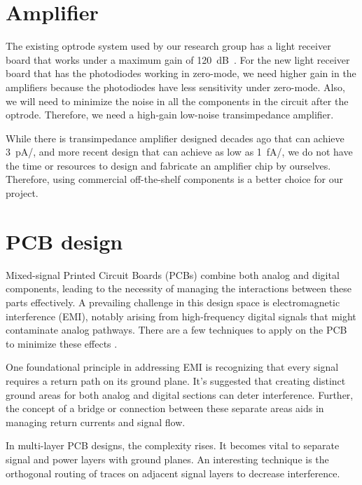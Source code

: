 \section{Amplifier}

The existing optrode system used by our research group has a light receiver board that works under a maximum gain of \qty{120}{dB\Omega}.  For the new light receiver board that has the photodiodes working in zero-mode, we need higher gain in the amplifiers because the photodiodes have less sensitivity under zero-mode.  Also, we will need to minimize the noise in all the components in the circuit after the optrode.  Therefore, we need a high-gain low-noise transimpedance amplifier.

While there is transimpedance amplifier \cite{TIA_1} designed decades ago that can achieve \qty{3}{pA/}, and more recent design \cite{TIA_2} \cite{TIA_3} that can achieve as low as \qty{1}{fA/}, we do not have the time or resources to design and fabricate an amplifier chip by ourselves.  Therefore, using commercial off-the-shelf components \cite{COTSTIA}\cite{OpenSouceTIA} is a better choice for our project.

\section{PCB design}

Mixed-signal Printed Circuit Boards (PCBs) combine both analog and digital components, leading to the necessity of managing the interactions between these parts effectively. A prevailing challenge in this design space is electromagnetic interference (EMI), notably arising from high-frequency digital signals that might contaminate analog pathways.  There are a few techniques to apply on the PCB to minimize these effects \cite{MixPCB} \cite{MixPCB_2} \cite{MixPCB_3}.

One foundational principle in addressing EMI is recognizing that every signal requires a return path on its ground plane. It's suggested that creating distinct ground areas for both analog and digital sections can deter interference. Further, the concept of a bridge or connection between these separate areas aids in managing return currents and signal flow.

In multi-layer PCB designs, the complexity rises. It becomes vital to separate signal and power layers with ground planes. An interesting technique is the orthogonal routing of traces on adjacent signal layers to decrease interference.

